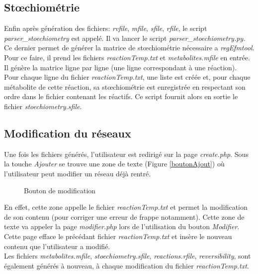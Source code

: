 \subsection{Stœchiométrie}
Enfin après génération des fichiers: \emph{rvfile}, \emph{mfile}, \emph{sfile}, \emph{rfile}, le script \emph{parser\_stoechiometry} est appelé. Il va lancer le script \emph{parser\_stoechiometry.py}. Ce dernier permet de générer la matrice de stœchiométrie nécessaire a \emph{regEfmtool}. Pour ce faire, il prend les fichiers \emph{reactionTemp.txt} et \emph{metabolites.mfile} en entrée. Il génère la matrice ligne par ligne (une ligne correspondant à une réaction). \\
Pour chaque ligne du fichier \emph{reactionTemp.txt}, une liste est créée et, pour chaque métabolite de cette réaction, sa stœchiométrie est enregistrée en respectant son ordre dans le fichier contenant les réactifs. Ce script fournit alors en sortie le fichier \emph{stoechiometry.sfile}.

\subsection{Modification du réseaux}
Une fois les fichiers générés, l'utilisateur est redirigé sur la page \emph{create.php}.
Sous la touche \emph{Ajouter} se trouve une zone de texte (Figure \ref{boutonAjout}) où l'utilisateur peut modifier un réseau déjà rentré.

\begin{figure}[!ht]
    \begin{center}
        \caption{Bouton de modification}
          \label{boutonModif}
      \end{center}   
\end{figure}

En effet, cette zone appelle le fichier \emph{reactionTemp.txt} et permet la modification de son contenu (pour corriger une erreur de frappe notamment). Cette zone de texte va appeler la page \emph{modifier.php} lors de l'utilisation du bouton \emph{Modifier}.\\
 Cette page efface le précédant fichier \emph{reactionTemp.txt} et insère le nouveau contenu que l'utilisateur a modifié. \\
 Les fichiers \emph{metabolites.mfile}, \emph{stoechiometry.sfile}, \emph{reactions.rfile}, \emph{reversibility}, sont également générés à nouveau, à chaque modification du fichier \emph{reactionTemp.txt}.
 
